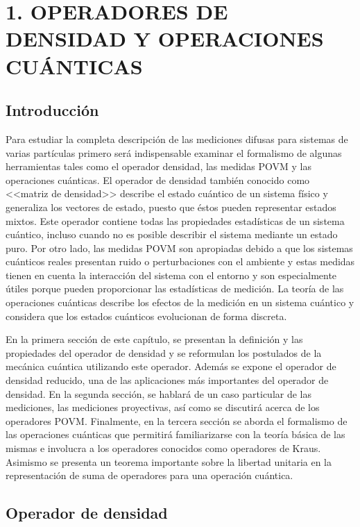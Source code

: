 \chapter[OPERADORES DE DENSIDAD Y OPERACIONES CUÁNTICAS]{1. OPERADORES DE DENSIDAD Y OPERACIONES CUÁNTICAS}
\section{Introducción}\label{IntroduccionMarcoteorico}

Para estudiar la completa descripción de las mediciones difusas para sistemas de varias partículas primero será indispensable examinar el formalismo de algunas herramientas tales como el operador densidad, las medidas POVM y las operaciones cuánticas. El operador de densidad también conocido como <<matriz de densidad>> describe el estado cuántico de un sistema físico y generaliza los vectores de estado, puesto que éstos pueden representar estados mixtos. Este operador contiene todas las propiedades estadísticas de un sistema cuántico, incluso cuando no es posible describir el sistema mediante un estado puro. Por otro lado, las medidas POVM son apropiadas debido a que los sistemas cuánticos reales presentan ruido o perturbaciones con el ambiente y estas medidas tienen en cuenta la interacción del sistema con el entorno y son especialmente útiles porque pueden proporcionar las estadísticas de medición. La teoría de las operaciones cuánticas describe los efectos de la medición en un sistema cuántico y considera que los estados cuánticos evolucionan de forma discreta.  

En la primera sección de este capítulo, se presentan la definición y las propiedades del operador de densidad y se reformulan los postulados de la mecánica cuántica utilizando este operador. Además se expone el operador de densidad reducido, una de las aplicaciones más importantes del operador de densidad. En la segunda sección, se hablará de un caso particular de las mediciones, las mediciones proyectivas, así como se discutirá acerca de los operadores POVM\@. Finalmente, en la tercera sección se aborda el formalismo de las operaciones cuánticas que permitirá familiarizarse con la teoría básica de las mismas e involucra a los operadores conocidos como operadores de Kraus. Asimismo se presenta un teorema importante sobre la libertad unitaria en la representación de suma de operadores para una operación cuántica.




\section{Operador de densidad}\label{OpDensidad}

